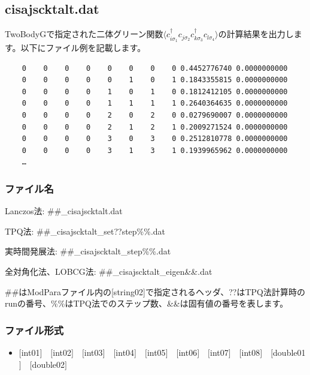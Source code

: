\newpage
\subsection{{cisajscktalt.dat}}
\label{Subsec:cisajscktalt}
TwoBodyGで指定された二体グリーン関数$\langle c_{i\sigma_1}^{\dagger}c_{j\sigma_2}c_{k\sigma_3}^{\dagger}c_{l\sigma_4}\rangle$の計算結果を出力します。以下にファイル例を記載します。

\begin{minipage}{15cm}
\begin{screen}
\begin{verbatim}
    0    0    0    0    0    0    0    0 0.4452776740 0.0000000000
    0    0    0    0    0    1    0    1 0.1843355815 0.0000000000
    0    0    0    0    1    0    1    0 0.1812412105 0.0000000000
    0    0    0    0    1    1    1    1 0.2640364635 0.0000000000
    0    0    0    0    2    0    2    0 0.0279690007 0.0000000000
    0    0    0    0    2    1    2    1 0.2009271524 0.0000000000
    0    0    0    0    3    0    3    0 0.2512810778 0.0000000000
    0    0    0    0    3    1    3    1 0.1939965962 0.0000000000
    …
\end{verbatim}
\end{screen}
\end{minipage}

\subsubsection{ファイル名}
 \begin{itemize}
   \item{Lanczos法:}  \#\#\_cisajscktalt.dat
   \item{TPQ法:} \#\#\_cisajscktalt\_set??step\%\%.dat
   {\item{実時間発展法:} \#\#\_cisajscktalt\_step\%\%.dat}
   \item{全対角化法、LOBCG法:}  \#\#\_cisajscktalt\_eigen{\&\&}.dat
  \end{itemize}
  \#\#はModParaファイル内の[string02]で指定されるヘッダ、??はTPQ法計算時のrunの番号、\%\%はTPQ法でのステップ数、\&\&は固有値の番号を表します。


\subsubsection{ファイル形式}
 \begin{itemize}
   \item  $[$int01$]$~~$[$int02$]$~~$[$int03$]$~~$[$int04$]$~~$[$int05$]$~~$[$int06$]$~~$[$int07$]$~~$[$int08$]$~~$[$double01$]$~~$[$double02$]$
  \end{itemize}
